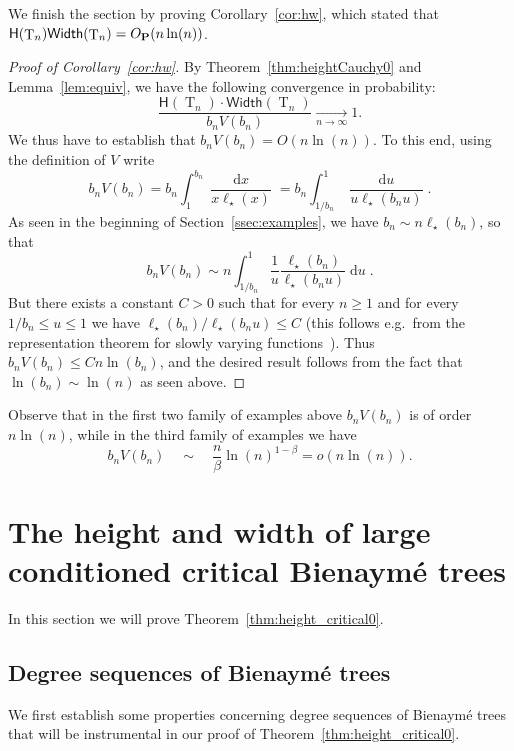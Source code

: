 \documentclass[10pt]{amsart}
\theoremstyle{definition}\newtheorem{defi}[theo]{Definition}\newtheorem{rema}[theo]{Remark}\newtheorem{exam}[theo]{Example}\newtheorem{exem}[theo]{Example}\newtheorem{nota}[theo]{Notation}
\newcommand{\height}{\mathsf{H}}
\newcommand{\p}{\mathbf{P}}
\newcommand{\Width}{\mathsf{Width}}
\DeclareMathOperator{\rtree}{T}
\DeclareMathOperator{\dxseq}{d\mathit{x}}
\DeclareMathOperator{\duseq}{d\mathit{u}}
\begin{document}
We finish the section by proving Corollary~\ref{cor:hw}, which stated that $\height(\rtree_{n})\Width(\rtree_{n}) \linebreak= O_{\p}({n \ln(n)})$.
\begin{proof}[Proof of Corollary~\ref{cor:hw}]
By Theorem~\ref{thm:heightCauchy0} and Lemma~\ref{lem:equiv}, we have the following convergence in probability:
\[
\frac{\height(\rtree_{n}) \cdot \Width(\rtree_{n}) }{ b_{n} V(b_{n})}  \xrightarrow[n\to\infty]{}  1.
\]
We thus have to establish that $ b_{n} V(b_{n}) = O(n \ln(n))$. To this end, using the definition of $V$ write
\[
b_{n} V(b_{n})= b_{n} \int_{1}^{ b_{n} } \frac{\dxseq}{x \ell_{\star}(x)}= b_{n} \int_{1/ b_{n} }^{1} \frac{\duseq}{u \ell_{\star}(b_{n} u)}.
\]
As seen in the beginning of Section~\ref{ssec:examples}, we have $ b_{n} \sim n \ell_{\star}(b_{n})$, so that
\[
b_{n} V(b_{n})  \sim  n \int_{1/ b_{n} }^{1} \frac{1}{u} \frac{\ell_{\star}(b_{n})}{ \ell_{\star}(b_{n} u)} \duseq.
\]
But there exists a constant $C>0$ such that for every $ n \geq 1$ and for every $1/ b_{n} \leq u \leq 1$ we have $\ell_{\star}(b_{n})/\ell_{\star}(b_{n} u) \leq C$ (this follows e.g.~from the representation theorem for slowly varying functions~\cite[Theorem~1.3.1]{BGT89}). Thus $ b_{n} V(b_{n}) \leq C n \ln(b_{n})$, and the desired result follows from the fact that $\ln(b_{n}) \sim \ln(n)$ as seen above.
\end{proof}

Observe that in the first two family of examples above $b_{n} V(b_{n})$ is of order $n \ln(n)$, while in the third family of examples we have
\[
b_{n} V(b_{n}) \quad \sim \quad \frac{n}{\beta} \ln(n)^{1-\beta} = o(n \ln(n)).
\]

\section{The height {and width} of large conditioned critical Bienaymé trees}\label{sec:height_critical}
In this section we will prove Theorem~\ref{thm:height_critical0}.


\subsection{Degree sequences of Bienaymé trees}\label{ssec:deg_seq_bien}
We first establish some properties concerning degree sequences of Bienaymé trees {that will be instrumental in our proof of Theorem~\ref{thm:height_critical0}.}
\end{document}
